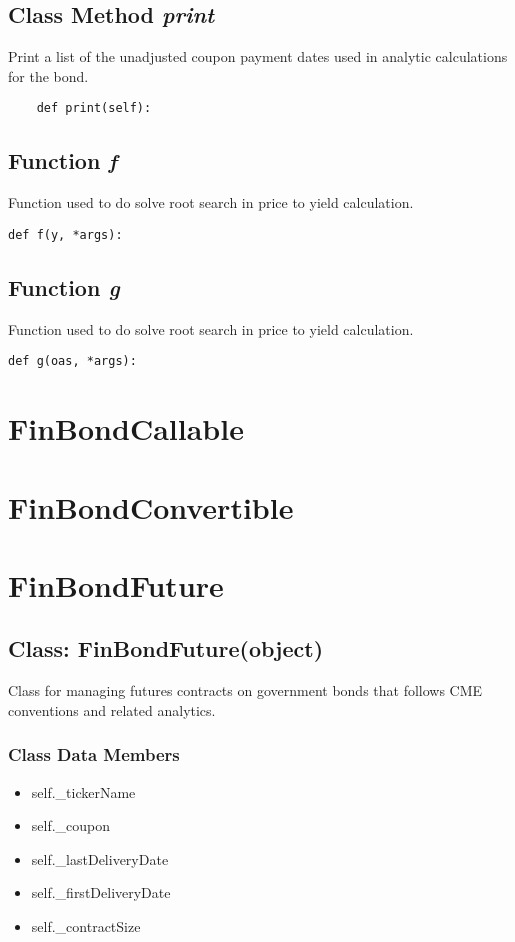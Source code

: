 \documentclass[twoside,11pt]{book}
\begin{document}
\subsection{Class Method {\it print}}
Print a list of the unadjusted coupon payment dates used in analytic calculations for the bond. 

\begin{lstlisting}
    def print(self):
\end{lstlisting}

\subsection{Function {\it f}}
Function used to do solve root search in price to yield calculation. 

\begin{lstlisting}
def f(y, *args):
\end{lstlisting}

\subsection{Function {\it g}}
Function used to do solve root search in price to yield calculation. 

\begin{lstlisting}
def g(oas, *args):
\end{lstlisting}

\newpage
\section{FinBondCallable}

\newpage
\section{FinBondConvertible}

\newpage
\section{FinBondFuture}

\subsection{Class: FinBondFuture(object)}
Class for managing futures contracts on government bonds that follows CME conventions and related analytics. 

\subsubsection{Class Data Members}
\begin{itemize}
\item{self.\_tickerName}
\item{self.\_coupon}
\item{self.\_lastDeliveryDate}
\item{self.\_firstDeliveryDate}
\item{self.\_contractSize}
\end{itemize}
\end{document}
